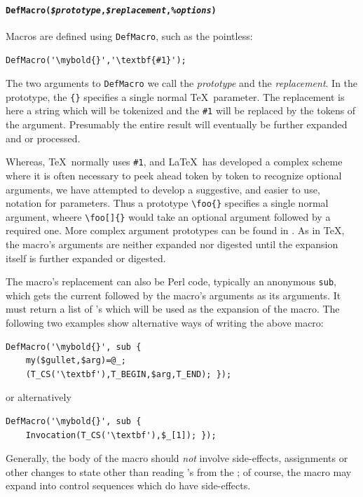 \documentclass{book}
\begin{document}
\paragraph[DefMacro]{%
   \texttt{DefMacro(\textit{\$prototype},\textit{\$replacement},\textit{\%options})}}
Macros are defined using \texttt{DefMacro}, such as the pointless:
\begin{lstlisting}[style=latexml]
  DefMacro('\mybold{}','\textbf{#1}');
\end{lstlisting}
The two arguments to \texttt{DefMacro} we call
the \emph{prototype} and the \emph{replacement}.
In the prototype, the \verb|{}| specifies a single normal \TeX\ parameter.
The replacement is here a string which will
be tokenized and the \verb|#1| will be replaced by the
tokens of the argument. Presumably the entire result will
eventually be further expanded and or processed.

Whereas, \TeX\ normally uses \verb|#1|, and \LaTeX\ has developed
a complex scheme where it is often necessary to peek ahead token
by token to recognize optional arguments, we have attempted
to develop a suggestive, and easier to use, notation for parameters.
Thus a prototype \verb|\foo{}| specifies a single normal argument,
wheere \verb|\foo[]{}| would take an optional argument followed
by a required one.  More complex argument prototypes can be
found in .
As in \TeX, the macro's arguments are neither expanded
nor digested until the expansion itself is further
expanded or digested.

The macro's replacement can also be Perl code, typically an
anonymous \texttt{sub}, which gets the current 
followed by the macro's arguments as its arguments.  It must
return a list of 's which will be used as the
expansion of the macro.  The following two examples show
alternative ways of writing the above macro:
\begin{lstlisting}[style=latexml]
  DefMacro('\mybold{}', sub {
    my($gullet,$arg)=@_;
    (T_CS('\textbf'),T_BEGIN,$arg,T_END); });
\end{lstlisting}
or alternatively
\begin{lstlisting}[style=latexml]
  DefMacro('\mybold{}', sub {
    Invocation(T_CS('\textbf'),$_[1]); });
\end{lstlisting}
Generally, the body of the macro should \emph{not} involve side-effects, assignments
or other changes to state other than reading 's from the ;
of course, the macro may expand into control sequences which do have side-effects.
\end{document}
